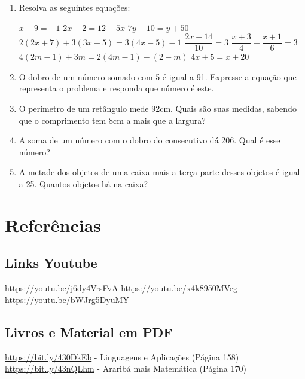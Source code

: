 \documentclass[12pt]{article}
\begin{document}
  \begin{enumerate}
    \item Resolva as seguintes equações:
      \begin{tasks}
        \task $x + 9 = -1$
        \task $2x - 2 = 12 - 5x$
        \task $7y - 10 = y + 50$
        \task $2(2x+7) + 3(3x-5) = 3(4x-5) - 1$
        \task $\dfrac{2x + 14}{10} = 3$
        \task $\dfrac{x+3}{4}+\dfrac{x+1}{6} = 3$
        \task $4(2m-1) + 3m = 2(4m-1)-(2-m)$
        \task $4x+5=x+20$
      \end{tasks}

    \item O dobro de um número somado com 5 é igual a 91. Expresse a equação que representa o problema e responda que número é este.

    \item O perímetro de um retângulo mede 92cm. Quais são suas medidas, sabendo que o comprimento tem 8cm a mais que a largura?

    \item A soma de um número com o dobro do consecutivo dá 206. Qual é esse número?

    \item A metade dos objetos de uma caixa mais a terça parte desses objetos é igual a 25. Quantos objetos há na caixa?
  \end{enumerate}

  \section{Referências}

  \subsection{Links Youtube}

  \begin{tasks}
    \task[\#] \url{https://youtu.be/j6dy4VrsFvA}
    \task[\#] \url{https://youtu.be/x4k8950MVeg}
    \task[\#] \url{https://youtu.be/bWJrg5DyuMY}
  \end{tasks}

  \subsection{Livros e Material em PDF}

  \begin{tasks}
    \task[\#] \url{https://bit.ly/430DkEb} -  Linguagens e Aplicações (Página 158)
    \task[\#] \url{https://bit.ly/43nQLhm} - Araribá mais Matemática (Página 170)
  \end{tasks}
\end{document}

